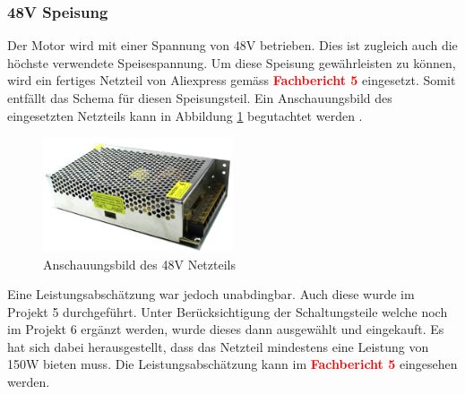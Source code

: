 \subsubsection{48V Speisung}
\label{subsubec:48V Speisung}


Der Motor wird mit einer Spannung von 48V betrieben. Dies ist zugleich auch die höchste verwendete Speisespannung. Um diese Speisung gewährleisten zu können, wird ein fertiges Netzteil von Aliexpress gemäss  \textcolor{red}{\textbf{Fachbericht 5}} eingesetzt. Somit entfällt das Schema für diesen Speisungsteil. Ein Anschauungsbild des eingesetzten Netzteils kann in Abbildung \ref{fig:Netzteil_48V} begutachtet werden \cite{aliexpress_us_nodate}.\\

\begin{figure}[h!]
	\centering
	\includegraphics[width=0.5\textwidth]{graphics/Netzteil_48V.png}
	\caption{Anschauungsbild des 48V Netzteils \cite{aliexpress_us_nodate}}
	\label{fig:Netzteil_48V}
\end{figure} 

Eine Leistungsabschätzung war jedoch unabdingbar. Auch diese wurde im Projekt 5 durchgeführt. Unter Berücksichtigung der Schaltungsteile welche noch im Projekt 6 ergänzt werden, wurde dieses dann ausgewählt und eingekauft. Es hat sich dabei herausgestellt, dass das Netzteil mindestens eine Leistung von 150W bieten muss. Die Leistungsabschätzung kann im \textcolor{red}{\textbf{Fachbericht 5}} eingesehen werden. 

\newpage